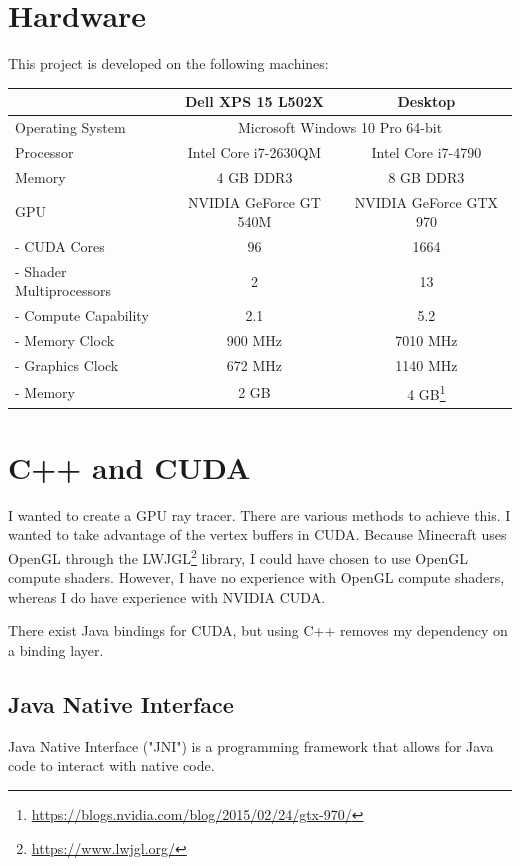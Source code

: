 \documentclass[]{article}
\begin{document}
\section{Hardware}
This project is developed on the following machines:

\begin{center}
  \begin{tabular}{| l || c | c |} \hline
    & Dell XPS 15 L502X & Desktop \\ \hline
    Operating System & \multicolumn{2}{c|}{Microsoft Windows 10 Pro 64-bit} \\ \hline
    Processor & Intel Core i7-2630QM & Intel Core i7-4790 \\ \hline
    Memory & 4 GB DDR3 & 8 GB DDR3 \\ \hline \hline
    GPU & NVIDIA GeForce GT 540M & NVIDIA GeForce GTX 970\\ \hline
    - CUDA Cores & 96 & 1664 \\ \hline
    - Shader Multiprocessors & 2 & 13 \\ \hline
    - Compute Capability & 2.1 & 5.2 \\ \hline
    - Memory Clock & 900 MHz & 7010 MHz \\ \hline
    - Graphics Clock & 672 MHz & 1140 MHz \\ \hline
    - Memory & 2 GB & 4 GB\footnote{\url{https://blogs.nvidia.com/blog/2015/02/24/gtx-970/}}\\ \hline
  \end{tabular}
\end{center}

\section{C++ and CUDA}
I wanted to create a GPU ray tracer.
There are various methods to achieve this. 
I wanted to take advantage of the vertex buffers in CUDA.
Because Minecraft uses OpenGL through the LWJGL\footnote{\url{https://www.lwjgl.org/}} library, I could have chosen to use OpenGL compute shaders.
However, I have no experience with OpenGL compute shaders, whereas I do have experience with NVIDIA CUDA.

There exist Java bindings for CUDA, but using C++ removes my dependency on a binding layer.
\subsection{Java Native Interface}
Java Native Interface ("JNI") is a programming framework that allows for Java code to interact with native code.
\end{document}
